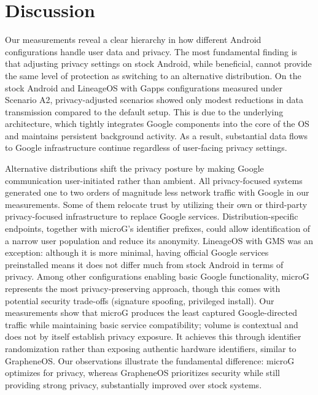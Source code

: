 \section{Discussion}

Our measurements reveal a clear hierarchy in how different Android configurations handle user data and privacy. The most fundamental finding is that adjusting privacy settings on stock Android, while beneficial, cannot provide the same level of protection as switching to an alternative distribution. On the stock Android and LineageOS with Gapps configurations measured under Scenario A2, privacy-adjusted scenarios showed only modest reductions in data transmission compared to the default setup. This is due to the underlying architecture, which tightly integrates Google components into the core of the OS and maintains persistent background activity. As a result, substantial data flows to Google infrastructure continue regardless of user-facing privacy settings.

Alternative distributions shift the privacy posture by making Google communication user-initiated rather than ambient. All privacy-focused systems generated one to two orders of magnitude less network traffic with Google in our measurements. Some of them relocate trust by utilizing their own or third-party privacy-focused infrastructure to replace Google services. Distribution-specific endpoints, together with microG's identifier prefixes, could allow identification of a narrow user population and reduce its anonymity. LineageOS with GMS was an exception: although it is more minimal, having official Google services preinstalled means it does not differ much from stock Android in terms of privacy. Among other configurations enabling basic Google functionality, microG represents the most privacy-preserving approach, though this comes with potential security trade-offs (signature spoofing, privileged install). Our measurements show that microG produces the least captured Google-directed traffic while maintaining basic service compatibility; volume is contextual and does not by itself establish privacy exposure. It achieves this through identifier randomization rather than exposing authentic hardware identifiers, similar to GrapheneOS. Our observations illustrate the fundamental difference: microG optimizes for privacy, whereas GrapheneOS prioritizes security while still providing strong privacy, substantially improved over stock systems.

